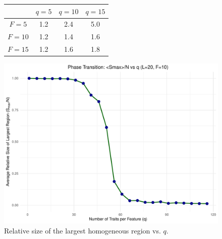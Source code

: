 \begin{figure}[h!] 
    \centering
    \begin{minipage}[c]{0.45\textwidth}
        \centering
        \begin{tabular}{c|ccc}
            \toprule
            & $q=5$ & $q=10$ & $q=15$ \\
            \midrule
            $F=5$ & 1.2 & 2.4 & 5.0 \\
            $F=10$ & 1.2 & 1.4 & 1.6 \\
            $F=15$ & 1.2 & 1.6 & 1.8 \\
            \bottomrule
        \end{tabular}
        \label{table:cultural_regions}
    \end{minipage}%
    \hfill%
    \begin{minipage}[c]{0.7\textwidth}
        \centering
        \includegraphics[width=\linewidth]{images/plot_phase_transition.pdf}
        \caption{Relative size of the largest homogeneous region vs. $q$.}
        \label{Phase_Transition}
    \end{minipage}
\end{figure}

\newpage